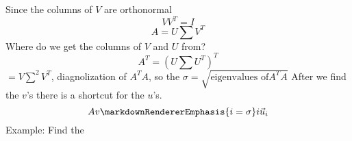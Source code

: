 \markdownRendererInterblockSeparator
{}Since the columns of $V$ are orthonormal\markdownRendererEllipsis{}\markdownRendererInterblockSeparator
{}$$VV^T=I$$\markdownRendererInterblockSeparator
{}$$A = U\sum V^T$$\markdownRendererInterblockSeparator
{}Where do we get the columns of $V$ and $U$ from?\markdownRendererInterblockSeparator
{}$$A^T = (U\sum U^T)^T$$\markdownRendererInterblockSeparator
{}$=V\sum^2 V^T$, diagnolization of $A^TA$, so the $\sigma=\sqrt{\text{eigenvalues of}A^TA}$\markdownRendererInterblockSeparator
{}After we find the $v$'s there is a shortcut for the $u$'s.\markdownRendererInterblockSeparator
{}$$Av\markdownRendererEmphasis{i=\sigma}i\vec{u}_i$$\markdownRendererInterblockSeparator
{}Example: Find the\relax